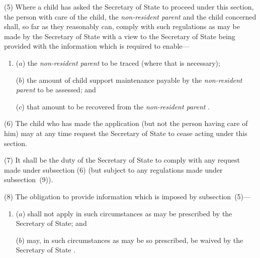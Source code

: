 \documentclass[12pt,a4paper]{article}
\begin{document}
(5) Where a child has asked the 
Secretary of State  %
to proceed under this section, the person with care of the child, the 
\emph{non-resident parent}  %
and the child concerned shall, so far as they reasonably can, comply with such regulations as may be made by the Secretary of State with a view to the 
Secretary of State  %
being provided with the information which is required to enable—
\begin{enumerate}\item[]
($a$) the 
\emph{non-resident parent}  %
to be traced (where that is necessary);

($b$) the amount of child support maintenance payable by the 
\emph{non-resident parent}  %
to be assessed; and

($c$) that amount to be recovered from the 
\emph{non-resident parent}%
.
\end{enumerate}

(6) The child who has made the application (but not the person having care of him) may at any time request the 
Secretary of State  %
to cease acting under this section.

(7) It shall be the duty of the 
Secretary of State  %
to comply with any request made under subsection (6)  (but subject to any regulations made under subsection~(9)).

(8) The obligation to provide information which is imposed by subsection~(5)—
\begin{enumerate}\item[]
($a$) shall not apply in such circumstances as may be prescribed by the Secretary of State; and

($b$) may, in such circumstances as may be so prescribed, be waived by the 
Secretary of State%
.
\end{enumerate}
\end{document}
